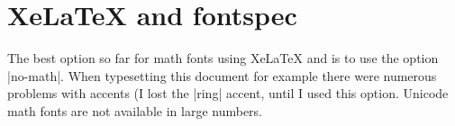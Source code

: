 
\section{XeLaTeX and fontspec}

The best option so far for math fonts using XeLaTeX and  is to use the option |no-math|. When typesetting this document for example there were numerous problems with accents (I lost the |ring| accent, until I used this option. Unicode math fonts are not available in large numbers.



\clearpage

